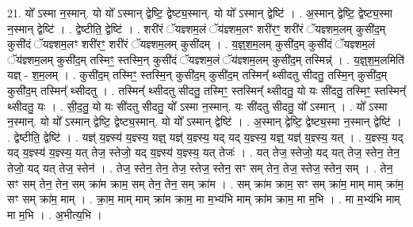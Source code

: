 \documentclass[17pt]{extarticle}
\begin{document}
21. यो᳚ ऽस्मा न॒स्मान्. यो यो᳚ ऽस्मान् द्वेष्टि॒ द्वेष्ट्य॒स्मान्. यो यो᳚ ऽस्मान् द्वेष्टि॑ । . अ॒स्मान् द्वेष्टि॒ द्वेष्ट्य॒स्मा न॒स्मान् द्वेष्टि॑ । . द्वेष्टीति॒ द्वेष्टि॑ । . शरी॑रं ॅयज्ञ्शम॒लं ॅय॑ज्ञ्शम॒लꣳ शरी॑रꣳ॒॒ शरी॑रं ॅयज्ञ्शम॒लम् कुसी॑द॒म् कुसी॑दं ॅयज्ञ्शम॒लꣳ शरी॑रꣳ॒॒ शरी॑रं ॅयज्ञ्शम॒लम् कुसी॑दम् । . य॒ज्ञ्॒श॒म॒लम् कुसी॑द॒म् कुसी॑दं ॅयज्ञ्शम॒लं ॅय॑ज्ञ्शम॒लम् कुसी॑द॒म् तस्मिꣳ॒॒ स्तस्मि॒न् कुसी॑दं ॅयज्ञ्शम॒लं ॅय॑ज्ञ्शम॒लम् कुसी॑द॒म् तस्मिन्न्॑ । . य॒ज्ञ्॒श॒म॒लमिति॑ यज्ञ् - श॒म॒लम् । . कुसी॑द॒म् तस्मिꣳ॒॒ स्तस्मि॒न् कुसी॑द॒म् कुसी॑द॒म् तस्मिन्᳚ थ्सीदतु सीदतु॒ तस्मि॒न् कुसी॑द॒म् कुसी॑द॒म् तस्मिन्᳚ थ्सीदतु । . तस्मिन्᳚ थ्सीदतु सीदतु॒ तस्मिꣳ॒॒ स्तस्मिन्᳚ थ्सीदतु॒ यो यः सी॑दतु॒ तस्मिꣳ॒॒ स्तस्मिन्᳚ थ्सीदतु॒ यः । . सी॒द॒तु॒ यो यः सी॑दतु सीदतु॒ यो᳚ ऽस्मा न॒स्मान्. यः सी॑दतु सीदतु॒ यो᳚ ऽस्मान् । . यो᳚ ऽस्मा न॒स्मान्. यो यो᳚ ऽस्मान् द्वेष्टि॒ द्वेष्ट्य॒स्मान्. यो यो᳚ ऽस्मान् द्वेष्टि॑ । . अ॒स्मान् द्वेष्टि॒ द्वेष्ट्य॒स्मा न॒स्मान् द्वेष्टि॑ । . द्वेष्टीति॒ द्वेष्टि॑ । . यज्ञ्॑ य॒ज्ञ्स्य॑ य॒ज्ञ्स्य॒ यज्ञ्॒ यज्ञ्॑ य॒ज्ञ्स्य॒ यद् यद् य॒ज्ञ्स्य॒ यज्ञ्॒ यज्ञ्॑ य॒ज्ञ्स्य॒ यत् । . य॒ज्ञ्स्य॒ यद् यद् य॒ज्ञ्स्य॑ य॒ज्ञ्स्य॒ यत् तेज॒ स्तेजो॒ यद् य॒ज्ञ्स्य॑ य॒ज्ञ्स्य॒ यत् तेजः॑ । . यत् तेज॒ स्तेजो॒ यद् यत् तेज॒ स्तेन॒ तेन॒ तेजो॒ यद् यत् तेज॒ स्तेन॑ । . तेज॒ स्तेन॒ तेन॒ तेज॒ स्तेज॒ स्तेन॒ सꣳ सम् तेन॒ तेज॒ स्तेज॒ स्तेन॒ सम् । . तेन॒ सꣳ सम् तेन॒ तेन॒ सम् क्रा॑म क्राम॒ सम् तेन॒ तेन॒ सम् क्रा॑म । . सम् क्रा॑म क्राम॒ सꣳ सम् क्रा॑म॒ माम् माम् क्रा॑म॒ सꣳ सम् क्रा॑म॒ माम् । . क्रा॒म॒ माम् माम् क्रा॑म क्राम॒ मा म॒भ्य॑भि माम् क्रा॑म क्राम॒ मा म॒भि । . मा म॒भ्य॑भि माम् मा म॒भि । . अ॒भीत्य॒भि । \newline
\end{document}
